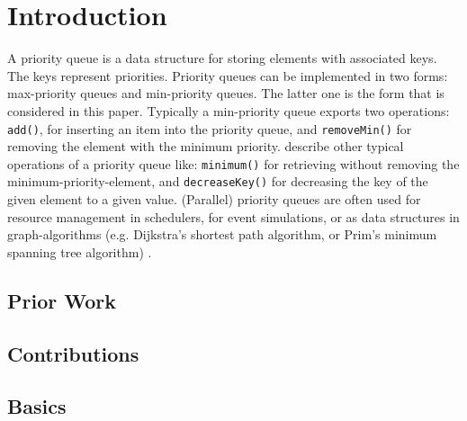 
\section{Introduction}


A priority queue is a data structure for storing elements with associated keys. The keys represent priorities. Priority queues can be implemented in two forms: max-priority queues and min-priority queues. The latter one is the form that is considered in this paper.
Typically a min-priority queue exports two operations: \texttt{add()}, for inserting an item into the priority queue, and \texttt{removeMin()} for removing the element with the minimum priority. \citeauthor{cormen_introduction_2009} describe other typical operations of a priority queue like: \texttt{minimum()} for retrieving without removing the minimum-priority-element, and \texttt{decreaseKey()} for decreasing the key of the given element to a given value.
(Parallel) priority queues are often used for resource management in schedulers, for event simulations, or as data structures in graph-algorithms (e.g. Dijkstra's shortest path algorithm, or Prim's minimum spanning tree algorithm) \cite{cormen_introduction_2009}.

\subsection{Prior Work}




\subsection{Contributions}

\subsection{Basics}


